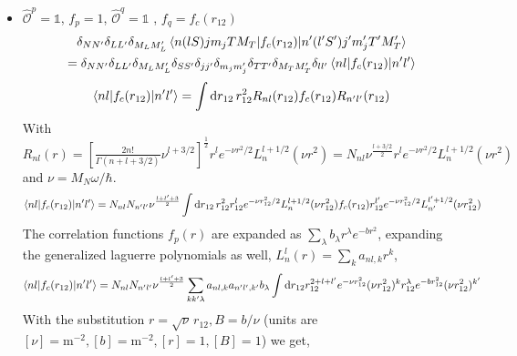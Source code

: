 \documentclass[10pt]{article}
\begin{document}
\begin{itemize}
	\item $\hat{\mathcal{O}}^{p} = \mathbb{1}$, $f_{p} = 1$, $\hat{\mathcal{O}}^{q} = \mathbb{1}$ , $f_{q} = f_c(r_{12})$ 
	\begin{multline*}
		\delta_{NN'} \delta_{LL'} \delta_{M_L M_L'} \braket{ n (l S) j m_j T M_T |  f_{c}(r_{12}) | n' (l' S') j' m_j' T' M_T'}  \\
		= \delta_{NN'} \delta_{LL'} \delta_{M_L M_L'} \delta_{SS'} \delta_{jj'} \delta_{m_j m_j'} \delta_{TT'} \delta_{M_T M_T'} \delta_{l l'} \braket{ n l |  f_{c}(r_{12}) | n' l'} 
	\end{multline*}
	\begin{multline*}
		\braket{ n l |  f_{c}(r_{12}) | n' l'} = \int \text{d} r_{12} \, r_{12}^{2} R_{nl}(r_{12}) f_{c}(r_{12}) R_{n'l'}(r_{12}) \\
	\end{multline*}
	With  $R_{nl}(r) = \left[ \frac{2n!}{\Gamma(n + l + 3/2)} \nu^{l + 3/2} \right]^{\frac{1}{2}} r^{l} e^{-\nu r^{2} /2} L_{n}^{l+1/2}(\nu r^{2}) = N_{nl} \nu^{\frac{l + 3/2}{2}} r^{l} e^{-\nu r^{2} /2} L_{n}^{l+1/2}(\nu r^{2})$ and $ \nu = M_N \omega / \hbar $.
	\begin{multline*}
		\braket{ n l |  f_{c}(r_{12}) | n' l'} = N_{nl} N_{n'l'} \nu^{\frac{l + l' + 3}{2}} \int \text{d} r_{12} \, r_{12}^{2} r_{12}^{l} e^{-\nu r_{12}^{2} /2} L_{n}^{l+1/2}(\nu r_{12}^{2}) f_{c}(r_{12}) r_{12}^{l'} e^{-\nu r_{12}^{2} /2} L_{n'}^{l'+1/2}(\nu r_{12}^{2}) \\
	\end{multline*}
	The correlation functions $f_{p}(r)$ are expanded as $ \sum_{\lambda} b_{\lambda} r^{\lambda} e^{-b r^{2}}$, expanding the generalized laguerre polynomials as well, $ L_{n}^{l}(r) = \sum_{k} a_{nl,k} r^{k}$,
	\begin{multline*}
		\braket{ n l |  f_{c}(r_{12}) | n' l'} = N_{nl} N_{n'l'} \nu^{\frac{l + l' + 3}{2}} \sum_{kk'\lambda} a_{nl,k} a_{n'l',k'} b_{\lambda}  \int \text{d} r_{12} r_{12}^{2+l+l'} e^{-\nu r_{12}^{2}} ( \nu r_{12}^{2} )^{k} r_{12}^{\lambda} e^{-b r_{12}^{2}} ( \nu r_{12}^{2})^{k'}
	\end{multline*}
	With the substitution $r = \sqrt{\nu} \, r_{12}, B = b/\nu$ (units are $[\nu] = \text{m}^{-2}, [b] = \text{m}^{-2}, [r] = 1, [B] = 1$) we get,

\end{itemize}
\end{document}
